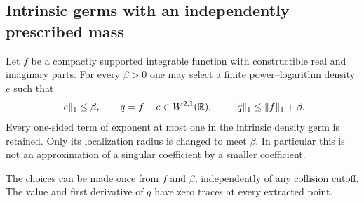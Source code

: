 \subsection{Intrinsic germs with an independently prescribed mass}
\begin{lemma}
\label{lem:v43-small-jet-mass}
Let $f$ be a compactly supported integrable function with constructible
real and imaginary parts. For every $\beta>0$ one may select a finite
power--logarithm density $e$ such that
\begin{equation}\label{eq:v43-one-component}
 \|e\|_1\le\beta,\qquad q=f-e\in W^{2,1}(\R),\qquad
 \|q\|_1\le\|f\|_1+\beta.
\end{equation}
Every one-sided term of exponent at most one in the intrinsic density
germ is retained. Only its localization radius is changed to meet
$\beta$. In particular this is not an approximation of a singular
coefficient by a smaller coefficient.

The choices can be made once from $f$ and $\beta$, independently of
any collision cutoff. The value and first derivative of $q$ have zero
traces at every extracted point.
\end{lemma}
